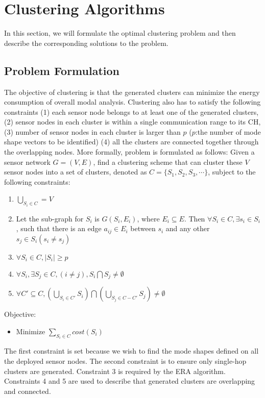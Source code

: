 \section{Clustering Algorithms}
In this section, we will formulate the optimal clustering problem and then describe the corresponding solutions to the problem.

\subsection{Problem Formulation}
\label{sec:OptimalClustering}
The objective of clustering is that the generated clusters can minimize the energy consumption of overall modal analysis. Clustering also has to satisfy the following constraints (1) each sensor node belongs to at least one of the generated clusters, (2) sensor nodes in each cluster is within a single communication range to its CH, (3) number of sensor nodes in each cluster is larger than \(p\) (\(p\):the number of mode shape vectors to be identified) (4) all the clusters are connected together through the overlapping nodes. More formally, problem is formulated as follows:
Given a sensor network \(G=(V,E)\), find a clustering scheme that can cluster these \(V\) sensor nodes into a set of clusters, denoted as \(C=\{S_1, S_2, S_3, \cdots\}\), subject to the following constraints:
\begin{enumerate}
	\item \( \bigcup\limits_{S_i \in C} = V\)
	\item Let the sub-graph for \(S_i\) is \(G(S_i,E_i)\), where \(E_i \subseteq E\). Then \(\forall S_i \in C, \exists s_i \in S_i\), such that there is an edge \(a_{ij} \in E_i\) between \(s_i\) and any other \(s_j \in S_i (s_i \neq s_j)\) 
	\item \(\forall S_i \in C, \left|S_i\right|\geq p\)
	\item \( \forall S_i, \exists S_j \in C, (i \neq j), S_i \bigcap S_j \neq \emptyset\)
	\item \(\forall C' \subseteq C, (\bigcup\limits_{S_i \in C'} S_i)\bigcap (\bigcup\limits_{S_j \in C-C'} S_j) \neq \emptyset \)
\end{enumerate}
Objective:
\begin{itemize}
\item Minimize \(\sum\limits_{S_i \in C} cost(S_i)\)
\end{itemize}

The first constraint is set because we wish to find the mode shapes defined on all the deployed sensor nodes. The second constraint is to ensure only single-hop clusters are generated. Constraint 3 is required by the ERA algorithm. Constraints 4 and 5 are used to describe that generated clusters are overlapping and connected. 

